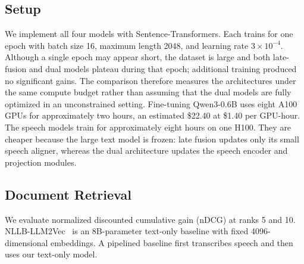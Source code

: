 \subsection{Setup}
We implement all four models with Sentence-Transformers. Each trains for one epoch with batch size 16, maximum length 2048, and learning rate \(3\times10^{-4}\). Although a single epoch may appear short, the dataset is large and both late-fusion and dual models plateau during that epoch; additional training produced no significant gains. The comparison therefore measures the architectures under the same compute budget rather than assuming that the dual models are fully optimized in an unconstrained setting. Fine-tuning Qwen3-0.6B uses eight A100 GPUs for approximately two hours, an estimated \$22.40 at \$1.40 per GPU-hour. The speech models train for approximately eight hours on one H100. They are cheaper because the large text model is frozen: late fusion updates only its small speech aligner, whereas the dual architecture updates the speech encoder and projection modules.

\subsection{Document Retrieval}
We evaluate normalized discounted cumulative gain (nDCG) at ranks 5 and 10. NLLB-LLM2Vec~\citep{nllbllm2vec} is an 8B-parameter text-only baseline with fixed 4096-dimensional embeddings. A pipelined baseline first transcribes speech and then uses our text-only model.

\begin{table}[ht]
    \centering
    \caption[Kallaama retrieval results]{Document-retrieval nDCG on Kallaama-Retrieval-Eval.}
    \label{tab:kallaama-results-mrl}
\end{table}

